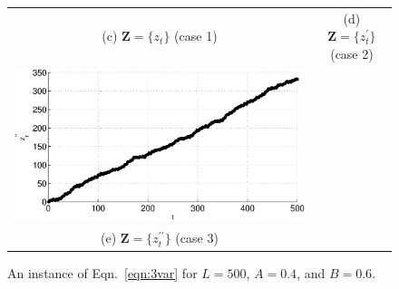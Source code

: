 \documentclass{article}[10pt]
\begin{document}
\begin{figure}[ht]
\begin{tabular}{cc}
(c) $\mathbf{Z} = \{z_t\}$ (case 1)& (d) $\mathbf{Z} = \{z_t^\prime\}$ (case 2) \\
\includegraphics[scale=0.48]{NoisyMultiResponseExample_z3.eps} &  \\
(e) $\mathbf{Z} = \{z_t^{\prime\prime}\}$ (case 3)& 
\end{tabular}
\caption{An instance of Eqn.\ \ref{eqn:3var} for $L=500$, $A=0.4$, and $B=0.6$.}
\label{fig:3varxyplot}
\end{figure}
\end{document}
